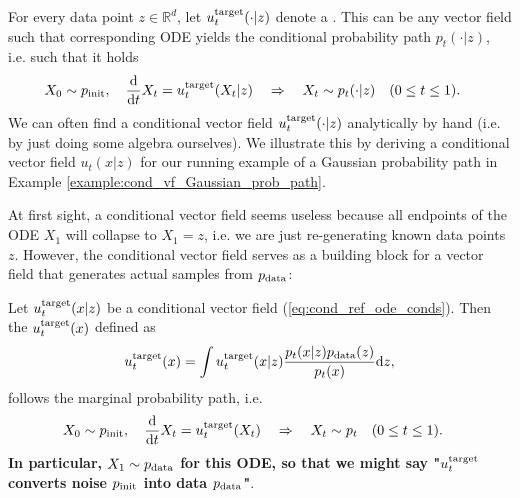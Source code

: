 For every data point $z\in \mathbb{R}^d$, let $u^{\text{target}}_t(\cdot|z)$ denote a . This can be any vector field such that corresponding ODE yields the conditional probability path $p_t(\cdot|z)$, i.e. such that it holds
\begin{align}
\label{eq:cond_ref_ode_conds}
X_0&\sim p_{\rm{init}},\quad \frac{\mathrm{d}}{\mathrm{d} t}X_t =u^{\text{target}}_t(X_t|z)\quad \Rightarrow \quad X_t\sim p_t(\cdot|z)\quad (0\leq t\leq 1).
\end{align}
We can often find a conditional vector field $u^{\text{target}}_t(\cdot|z)$  analytically by hand (i.e. by just doing some algebra ourselves). We illustrate this by deriving a conditional vector field $u_t(x|z)$ for our running example of a Gaussian probability path in Example \ref{example:cond_vf_Gaussian_prob_path}.

At first sight, a conditional vector field seems useless because all endpoints of the ODE $X_1$ will collapse to $X_1=z$, i.e. we are just re-generating known data points $z$. However, the conditional vector field serves as a building block for a vector field that generates actual samples from $p_{\rm{data}}$:
\begin{theorem}
\label{thm:marginalization_trick}
Let $u^{\text{target}}_t(x|z)$ be a conditional vector field (\cref{eq:cond_ref_ode_conds}). Then the  $u^{\text{target}}_t(x)$ defined as
\begin{align}
    \label{eq:marginal_vector_field}
    u^{\text{target}}_t(x) = \int u^{\text{target}}_t(x|z)\frac{p_t(x|z)p_{\rm{data}}(z)}{p_t(x)}\mathrm{d} z,
\end{align}
follows the marginal probability path, i.e. 
\begin{align}
\label{eq:marginal_ode_follows_marginal_path}
    X_0&\sim p_{\rm{init}},\quad \frac{\mathrm{d}}{\mathrm{d} t}X_t =u^{\text{target}}_t(X_t)\quad \Rightarrow \quad X_t\sim p_t\quad (0\leq t\leq 1).
\end{align}
\textbf{In particular, $X_1\sim p_{\rm{data}}$ for this ODE, so that we might say "$u^{\text{target}}_t$ converts noise $p_{\rm{init}}$ into data $p_{\rm{data}}$"}.
\end{theorem}




